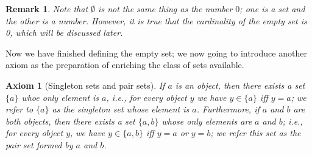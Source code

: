 \documentclass[a4paper]{book}
\newtheorem{axiom}{Axiom}[chapter]
\newtheorem{remark}{Remark}[section]
\begin{document}
			\begin{remark}
				Note that $\emptyset$ is not the same thing as the number $0$; one is a set and the other is a number. However, it is true that the cardinality of the empty set is 0, which will be discussed later.
			\end{remark}
			Now we have finished defining the empty set; we now going to introduce another axiom as the preparation of enriching the class of sets available.
			\begin{axiom}[Singleton sets and pair sets]
				If $a$ is an object, then there exists a set $\{a\}$ whoe only element is $a$, \textit{i.e.,} for every object $y$ we have $y\in\{a\}$ iff $y=a$; we refer to $\{a\}$ as the singleton set whose element is $a$. Furthermore, if $a$ and $b$ are both objects, then there exists a set $\{a,b\}$ whose only elements are $a$ and $b$; \textit{i.e.,} for every object $y$, we have $y\in\{a,b\}$ iff $y=a$ or $y=b$; we refer this set as the pair set formed by $a$ and $b$.
			\end{axiom}
\end{document}
